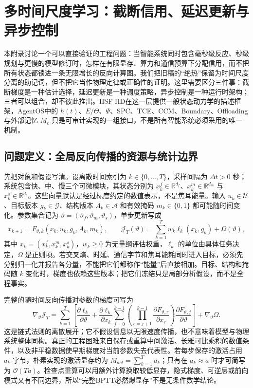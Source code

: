 \chapter{多时间尺度学习：截断信用、延迟更新与异步控制}
\label{app:adiabatic_backprop}

本附录讨论一个可以直接验证的工程问题：当智能系统同时包含毫秒级反应、秒级规划与更慢的模型修订时，怎样在有限显存、算力和通信预算下分配信用，而不把所有状态都锁进一条无限增长的反向计算图。我们把旧稿的“绝热”保留为时间尺度分离的助记词，但不把它当作物理定律或正确性的证明。这里需要区分三件事：截断梯度是一种估计选择，延迟更新是一种调度策略，异步控制是一种运行时架构；三者可以组合，却不彼此推出。HSF-HD在这一层提供一般状态动力学的描述框架，AgentOS中的 $h(t)$、$E/\Theta$、$\Psi$、SPC、TCE、CCM、Boundary、Offloading 与外部记忆 $M_e$ 只是可审计实现的一组接口，不是所有智能系统必须采用的唯一机制。

\section{问题定义：全局反向传播的资源与统计边界}
\label{sec:app_physical_dilemma}

先把对象和假设写清。设离散时间索引为 $k\in\{0,\ldots,T\}$，采样间隔为 $\Delta t>0$ 秒；系统包含快、中、慢三个可微模块，其状态分别为 $x_k^f\in\mathbb{R}^{d_f}$、$x_k^m\in\mathbb{R}^{d_m}$ 与 $x_k^s\in\mathbb{R}^{d_s}$。这些向量默认是经过标度约定的数值表示，不是焦耳能量。输入 $u_k\in\mathcal U$、目标版本 $g_k\in\mathcal G$、结构版本 $A_k\in\mathcal A$ 和有效掩码 $m_k\in\{0,1\}$ 都可能随时间变化。参数集合记为 $\vartheta=(\vartheta_f,\vartheta_m,\vartheta_s)$，单步更新写成
\begin{equation}
  x_{k+1}=F_{\vartheta,k}(x_k,u_k,g_k,A_k,m_k),
  \qquad
  \mathcal J_T(\vartheta)=\sum_{k=1}^{T}w_k\ell_k(x_k,g_k)+\Omega(\vartheta),
\end{equation}
其中 $x_k=(x_k^f,x_k^m,x_k^s)$，$w_k\geq 0$ 为无量纲评估权重，$\ell_k$ 的单位由具体任务决定，$\Omega$ 是正则项。若交叉熵、时延、通信字节和焦耳能耗同时进入目标，必须先分别归一化并报告各分量，不能把它们都称作“能量”后直接相加。目标、结构和掩码随 $k$ 变化时，梯度也依赖这些版本；把它们冻结只是局部分析假设，而不是全程事实。

完整的随时间反向传播对参数的梯度可写为
\begin{equation}
 \nabla_{\vartheta}\mathcal J_T
 =\sum_{k=1}^{T}\left[
 \frac{\partial \ell_k}{\partial \vartheta}
 +\frac{\partial \ell_k}{\partial x_k}
 \sum_{j=0}^{k-1}
 \left(\prod_{r=j+1}^{k-1}\frac{\partial F_{\vartheta,r}}{\partial x_r}\right)
 \frac{\partial F_{\vartheta,j}}{\partial \vartheta}
 \right]+\nabla_{\vartheta}\Omega .
\end{equation}
这是链式法则的离散展开；它不假设信息以无限速度传播，也不意味着模型与物理系统整体同构。真正的工程困难来自保存或重算中间激活、长雅可比乘积的数值条件，以及非平稳数据使早期梯度对当前参数失去代表性。若每步保存的激活占用 $a_k$ 字节，朴素实现的激活显存约为 $M_{act}=\sum_{k=1}^{T}a_k$；只有在 $a_k\approx a$ 时才可简写为 $\mathcal O(Ta)$。检查点重算可以用额外计算换取较低显存，隐式梯度、可逆层或前向模式又有不同边界，所以“完整BPTT必然爆显存”不是无条件数学结论。

